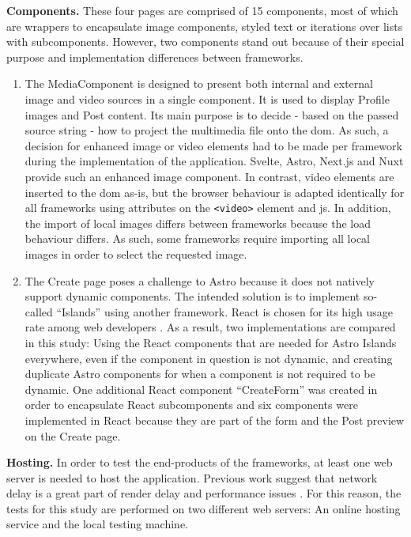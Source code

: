 \documentclass[a4paper, 12pt]{article}
\begin{document}
\textbf{Components.} These four pages are comprised of 15 components, most of which are wrappers to encapsulate image components, styled text or iterations over lists with subcomponents.
However, two components stand out because of their special purpose and implementation differences between frameworks.

\begin{enumerate}
  \item The MediaComponent is designed to present both internal and external image and video sources in a single component.
  It is used to display Profile images and Post content.
  Its main purpose is to decide - based on the passed source string - how to project the multimedia file onto the \acrshort{dom}.
  As such, a decision for enhanced image or video elements had to be made per framework during the implementation of the application.
  Svelte, Astro, Next.js and Nuxt provide such an enhanced image component.
  In contrast, video elements are inserted to the \acrshort{dom} as-is, but the browser behaviour is adapted identically for all frameworks using attributes on the \verb|<video>| element and \acrlong{js}.
  In addition, the import of local images differs between frameworks because the load behaviour differs.
  As such, some frameworks require importing all local images in order to select the requested image.
  \item The Create page poses a challenge to Astro because it does not natively support dynamic components.
  The intended solution is to implement so-called \enquote{Islands} using another framework.
  React is chosen for its high usage rate among web developers \citep{stateOfJs2023}.
  As a result, two implementations are compared in this study: Using the React components that are needed for Astro Islands everywhere, even if the component in question is not dynamic, and creating duplicate Astro components for when a component is not required to be dynamic.
  One additional React component \enquote{CreateForm} was created in order to encapsulate React subcomponents and six components were implemented in React because they are part of the form and the Post preview on the Create page.
\end{enumerate}

\textbf{Hosting.} In order to test the end-products of the frameworks, at least one web server is needed to host the application.
Previous work suggest that network delay is a great part of render delay and performance issues \citep{highperformancebrowsernetworking}.
For this reason, the tests for this study are performed on two different web servers: An online hosting service and the local testing machine.
\end{document}
